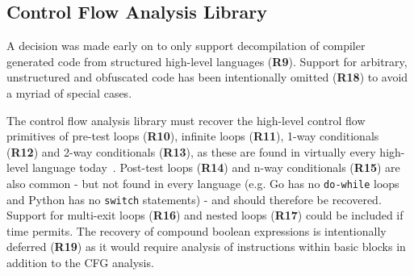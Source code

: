 
\subsection{Control Flow Analysis Library}
\label{sec:req_control_flow_analysis_library}

A decision was made early on to only support decompilation of compiler generated code from structured high-level languages (\textbf{R9}). Support for arbitrary, unstructured and obfuscated code has been intentionally omitted (\textbf{R18}) to avoid a myriad of special cases.

The control flow analysis library must recover the high-level control flow primitives of pre-test loops (\textbf{R10}), infinite loops (\textbf{R11}), 1-way conditionals (\textbf{R12}) and 2-way conditionals (\textbf{R13}), as these are found in virtually every high-level language today~\cite{reverse_comp}. Post-test loops (\textbf{R14}) and n-way conditionals (\textbf{R15}) are also common - but not found in every language (e.g. Go has no \texttt{do-while} loops and Python has no \texttt{switch} statements) - and should therefore be recovered. Support for multi-exit loops (\textbf{R16}) and nested loops (\textbf{R17}) could be included if time permits. The recovery of compound boolean expressions is intentionally deferred (\textbf{R19}) as it would require analysis of instructions within basic blocks in addition to the CFG analysis.

